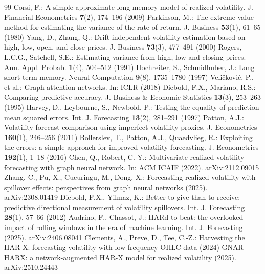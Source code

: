 \documentclass[runningheads]{llncs}
\begin{document}
\begin{thebibliography}{99}
 Corsi, F.: A simple approximate long-memory model of realized volatility. J. Financial Econometrics \textbf{7}(2), 174--196 (2009)
 Parkinson, M.: The extreme value method for estimating the variance of the rate of return. J. Business \textbf{53}(1), 61--65 (1980)
 Yang, D., Zhang, Q.: Drift-independent volatility estimation based on high, low, open, and close prices. J. Business \textbf{73}(3), 477--491 (2000)
 Rogers, L.C.G., Satchell, S.E.: Estimating variance from high, low and closing prices. Ann. Appl. Probab. \textbf{1}(4), 504--512 (1991)
 Hochreiter, S., Schmidhuber, J.: Long short-term memory. Neural Computation \textbf{9}(8), 1735--1780 (1997)
 Veli\v{c}kovi\'c, P., et al.: Graph attention networks. In: ICLR (2018)
 Diebold, F.X., Mariano, R.S.: Comparing predictive accuracy. J. Business \& Economic Statistics \textbf{13}(3), 253--263 (1995)
 Harvey, D., Leybourne, S., Newbold, P.: Testing the equality of prediction mean squared errors. Int. J. Forecasting \textbf{13}(2), 281--291 (1997)
 Patton, A.J.: Volatility forecast comparison using imperfect volatility proxies. J. Econometrics \textbf{160}(1), 246--256 (2011)
 Bollerslev, T., Patton, A.J., Quaedvlieg, R.: Exploiting the errors: a simple approach for improved volatility forecasting. J. Econometrics \textbf{192}(1), 1--18 (2016)
 Chen, Q., Robert, C.-Y.: Multivariate realized volatility forecasting with graph neural network. In: ACM ICAIF (2022). arXiv:2112.09015
 Zhang, C., Pu, X., Cucuringu, M., Dong, X.: Forecasting realized volatility with spillover effects: perspectives from graph neural networks (2025). arXiv:2308.01419
 Diebold, F.X., Yilmaz, K.: Better to give than to receive: predictive directional measurement of volatility spillovers. Int. J. Forecasting \textbf{28}(1), 57--66 (2012)
 Audrino, F., Chassot, J.: HARd to beat: the overlooked impact of rolling windows in the era of machine learning. Int. J. Forecasting (2025). arXiv:2406.08041
 Clements, A., Preve, D., Tee, C.-Z.: Harvesting the HAR-X: forecasting volatility with low-frequency OHLC data (2024)
 GNAR-HARX: a network-augmented HAR-X model for realized volatility (2025). arXiv:2510.24443
\end{thebibliography}
\end{document}
